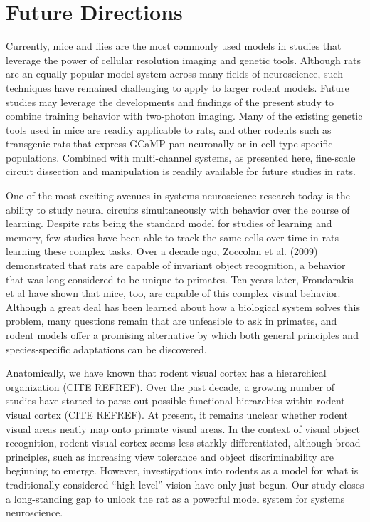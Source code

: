 \section{Future Directions}
Currently, mice and flies are the most commonly used models in studies that leverage the power of cellular resolution imaging and genetic tools. Although rats are an equally popular model system across many fields of neuroscience, such techniques have remained challenging to apply to larger rodent models. Future studies may leverage the developments and findings of the present study to combine training behavior with two-photon imaging. Many of the existing genetic tools used in mice are readily applicable to rats, and other rodents such as transgenic rats that express GCaMP pan-neuronally or in cell-type specific populations. Combined with multi-channel systems, as presented here, fine-scale circuit dissection and manipulation is readily available for future studies in rats. 

One of the most exciting avenues in systems neuroscience research today is the ability to study neural circuits simultaneously with behavior over the course of learning. Despite rats being the standard model for studies of learning and memory, few studies have been able to track the same cells over time in rats learning these complex tasks. Over a decade ago, Zoccolan et al. (2009) demonstrated that rats are capable of invariant object recognition, a behavior that was long considered to be unique to primates. Ten years later, Froudarakis et al have shown that mice, too, are capable of this complex visual behavior. Although a great deal has been learned about how a biological system solves this problem, many questions remain that are unfeasible to ask in primates, and rodent models offer a promising alternative by which both general principles and species-specific adaptations can be discovered. 

Anatomically, we have known that rodent visual cortex has a hierarchical organization (CITE REFREF). Over the past decade, a growing number of studies have started to parse out possible functional hierarchies within rodent visual cortex (CITE REFREF). At present, it remains unclear whether rodent visual areas neatly map onto primate visual areas. In the context of visual object recognition, rodent visual cortex seems less starkly differentiated, although broad principles, such as increasing view tolerance and object discriminability are beginning to emerge. However, investigations into rodents as a model for what is traditionally considered “high-level” vision have only just begun. Our study closes a long-standing gap to unlock the rat as a powerful model system for systems neuroscience. 


